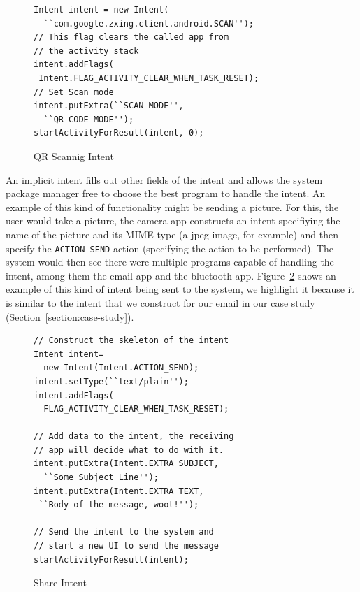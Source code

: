 \documentclass{acm_proc_article-sp}
\begin{document}
\begin{figure}
  \caption{QR Scannig Intent}
  \label{fig:qr-scanning-intent}
  \begin{lstlisting}
Intent intent = new Intent(
  ``com.google.zxing.client.android.SCAN'');
// This flag clears the called app from 
// the activity stack
intent.addFlags(
 Intent.FLAG_ACTIVITY_CLEAR_WHEN_TASK_RESET);
// Set Scan mode
intent.putExtra(``SCAN_MODE'', 
  ``QR_CODE_MODE'');
startActivityForResult(intent, 0);
  \end{lstlisting}
\end{figure}

An implicit intent fills out other fields of the intent
and allows the system package manager free to choose the best program
to handle the intent.  An example of this kind of functionality might
be sending a picture.  For this, the user would take a picture, the
camera app constructs an intent specifiying the name of the picture
and its MIME type (a jpeg image, for example) and then specify the
\texttt{ACTION\_SEND} action (specifying the action to be performed).  The
system would then see there were multiple programs capable of handling
the intent, among them the email app and the bluetooth app.
Figure~\ref{fig:share-intent} 
shows an example of this kind of intent
being sent to the system, we highlight it because it is similar to
the intent that we construct for our email in our case study
(Section~\ref{section:case-study}).

\begin{figure}
  \caption{Share Intent}
  \label{fig:share-intent}
  \begin{lstlisting}
// Construct the skeleton of the intent
Intent intent=
  new Intent(Intent.ACTION_SEND);
intent.setType(``text/plain'');
intent.addFlags(
  FLAG_ACTIVITY_CLEAR_WHEN_TASK_RESET);

// Add data to the intent, the receiving
// app will decide what to do with it.
intent.putExtra(Intent.EXTRA_SUBJECT, 
  ``Some Subject Line'');
intent.putExtra(Intent.EXTRA_TEXT,
 ``Body of the message, woot!'');

// Send the intent to the system and
// start a new UI to send the message
startActivityForResult(intent);
\end{lstlisting}
\end{figure}
\end{document}
